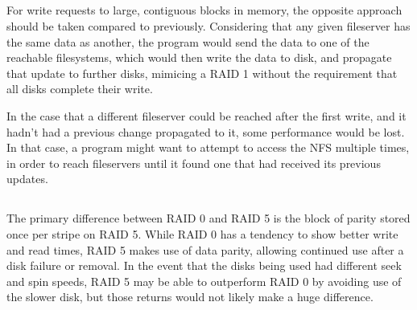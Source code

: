 \documentclass{article}
\begin{document}
\subsection{}
For write requests to large, contiguous blocks in memory, the opposite approach should be taken compared to previously. Considering that any given fileserver has the same data as another, the program would send the data to one of the reachable filesystems, which would then write the data to disk, and propagate that update to further disks, mimicing a RAID 1 without the requirement that all disks complete their write.

In the case that a different fileserver could be reached after the first write, and it hadn't had a previous change propagated to it, some performance would be lost. In that case, a program might want to attempt to access the NFS multiple times, in order to reach fileservers until it found one that had received its previous updates.

\subsection{}
The primary difference between RAID 0 and RAID 5 is the block of parity stored once per stripe on RAID 5. While RAID 0 has a tendency to show better write and read times, RAID 5 makes use of data parity, allowing continued use after a disk failure or removal. In the event that the disks being used had different seek and spin speeds, RAID 5 may be able to outperform RAID 0 by avoiding use of the slower disk, but those returns would not likely make a huge difference.
\end{document}
